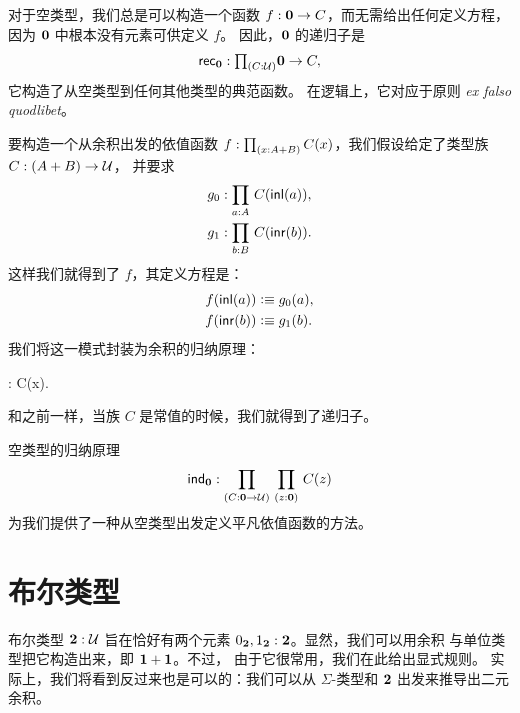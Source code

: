 对于空类型，我们总是可以构造一个函数 $f : \mathbf{0} \to C$，而无需给出任何定义方程，因为 $\mathbf{0}$ 中根本没有元素可供定义 $f$。
因此，$\mathbf{0}$ 的递归子是
%
\[\rec{\emptyt} : \tprd{C:\UU} \emptyt \to C,\]
它构造了从空类型到任何其他类型的典范函数。
在逻辑上，它对应于原则 \textit{ex falso quodlibet}。

要构造一个从余积出发的依值函数 $f:\prd{x:A+B}C(x)$，我们假设给定了类型族
$C: (A + B) \to \mathcal{U}$，
并要求
\begin{align*}
  g_0 &: \prd{a:A} C(\inl(a)), \\
  g_1 &: \prd{b:B} C(\inr(b)).
\end{align*}
这样我们就得到了 $f$，其定义方程是：
\begin{align*}
  f({\mathsf{inl}}(a)) &\vcentcolon\equiv g_0(a), \\
  f({\mathsf{inr}}(b)) &\vcentcolon\equiv g_1(b).
\end{align*}
我们将这一模式封装为余积的归纳原理：
%
\begin{narrowmultline*}
   :
   \to \narrowbreak
   \to {}C(x). 
\end{narrowmultline*}
和之前一样，当族 $C$ 是常值的时候，我们就得到了递归子。

空类型的归纳原理
%
\[ \ind{\emptyt} : \prd{C:\emptyt \to \UU}{z:\emptyt} C(z) \]
为我们提供了一种从空类型出发定义平凡依值函数的方法。%

%
%

\section{布尔类型}
\label{sec:type-booleans}

%
%
布尔类型 $\mathbf{2}:\mathcal{U}$ 旨在恰好有两个元素
${0_{\mathbf{2}}},{1_{\mathbf{2}}} : \mathbf{2}$。显然，我们可以用余积
%
与单位类型把它构造出来，即 $\mathbf{1} + \mathbf{1}$。不过，
由于它很常用，我们在此给出显式规则。
实际上，我们将看到反过来也是可以的：我们可以从 $\Sigma$-类型和 $\mathbf{2}$ 出发来推导出二元余积。

